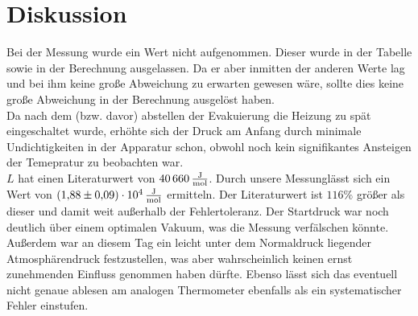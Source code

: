 \section{Diskussion}
\label{sec:Diskussion}

Bei der Messung wurde ein Wert nicht aufgenommen. Dieser wurde in der Tabelle sowie in der Berechnung ausgelassen. 
Da er aber inmitten der anderen Werte lag und bei ihm keine große Abweichung zu erwarten gewesen wäre, sollte dies keine große Abweichung in der 
Berechnung ausgelöst haben.\\
Da nach dem (bzw. davor) abstellen der Evakuierung die Heizung zu spät eingeschaltet wurde, erhöhte sich der Druck am Anfang durch 
minimale Undichtigkeiten in der Apparatur schon, obwohl noch kein signifikantes Ansteigen der Temepratur zu beobachten war.\\ \noindent
$L$ hat einen Literaturwert von $\SI{40 660}{\frac{\joule}{\mol}}$\cite{Gaskonstante}. Durch unsere Messunglässt sich ein Wert von
$\SI{1.88 +- 0.09e4}{\frac{\joule}{\mol}}$ ermitteln. Der Literaturwert ist $116\%$ größer als dieser und damit weit außerhalb der Fehlertoleranz. \noindent
Der Startdruck war noch deutlich über einem optimalen Vakuum, was die Messung  verfälschen könnte. Außerdem war an diesem Tag ein leicht unter dem
Normaldruck liegender Atmosphärendruck festzustellen, was aber wahrscheinlich keinen ernst zunehmenden Einfluss genommen haben dürfte. Ebenso lässt sich das eventuell nicht genaue
ablesen am analogen Thermometer ebenfalls als ein systematischer Fehler einstufen.